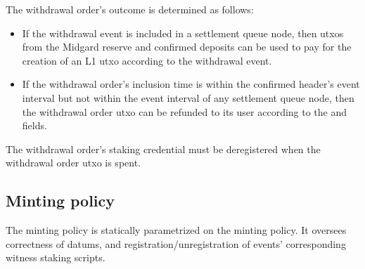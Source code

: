 \documentclass[../midgard.tex]{subfiles}
\begin{document}
The withdrawal order's outcome is determined as follows:
\begin{itemize}
    \item If the withdrawal event is included in a settlement queue node, then utxos from the Midgard reserve and confirmed deposits can be used to pay for the creation of an L1 utxo according to the withdrawal event.
    \item If the withdrawal order's inclusion time is within the confirmed header's event interval but not within the event interval of any settlement queue node, then the withdrawal order utxo can be refunded to its user according to the  and  fields.
\end{itemize}

The withdrawal order's  staking credential must be deregistered when the withdrawal order utxo is spent.

\subsection{Minting policy}
\label{h:withdrawal-order-minting-policy}

The  minting policy is statically parametrized on the  minting policy.
It oversees correctness of datums, and registration/unregistration of events' corresponding witness staking scripts.
\end{document}
